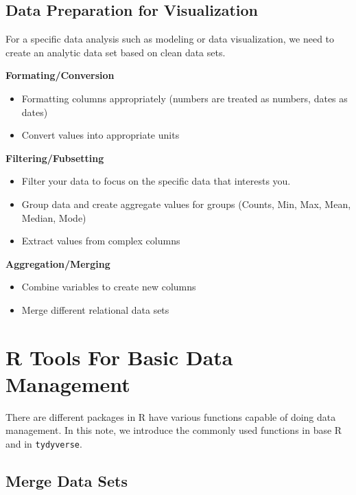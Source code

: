 \documentclass[
]{article}
\providecommand{\tightlist}{%
  \setlength{\itemsep}{0pt}\setlength{\parskip}{0pt}}
\begin{document}
\hypertarget{data-preparation-for-visualization}{%
\subsection{Data Preparation for
Visualization}\label{data-preparation-for-visualization}}

For a specific data analysis such as modeling or data visualization, we
need to create an analytic data set based on clean data sets.

\textbf{Formating/Conversion}

\begin{itemize}
\tightlist
\item
  Formatting columns appropriately (numbers are treated as numbers,
  dates as dates)
\item
  Convert values into appropriate units
\end{itemize}

\textbf{Filtering/Fubsetting}

\begin{itemize}
\tightlist
\item
  Filter your data to focus on the specific data that interests you.
\item
  Group data and create aggregate values for groups (Counts, Min, Max,
  Mean, Median, Mode)
\item
  Extract values from complex columns
\end{itemize}

\textbf{Aggregation/Merging}

\begin{itemize}
\tightlist
\item
  Combine variables to create new columns
\item
  Merge different relational data sets
\end{itemize}

\hypertarget{r-tools-for-basic-data-management}{%
\section{R Tools For Basic Data
Management}\label{r-tools-for-basic-data-management}}

There are different packages in R have various functions capable of
doing data management. In this note, we introduce the commonly used
functions in base R and in \texttt{tydyverse}.

\hypertarget{merge-data-sets}{%
\subsection{Merge Data Sets}\label{merge-data-sets}}
\end{document}
